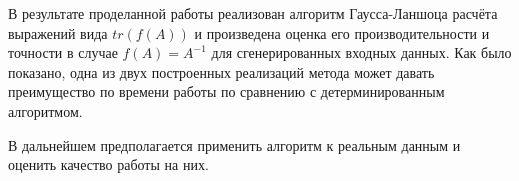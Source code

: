 В результате проделанной работы реализован алгоритм Гаусса-Ланшоца расчёта выражений вида $ tr(f(A)) $ и произведена оценка его производительности и точности в случае $ f(A) = A^{-1} $ для сгенерированных входных данных.
Как было показано, одна из двух построенных реализаций метода может давать преимущество по времени работы по сравнению с детерминированным алгоритмом.

В дальнейшем предполагается применить алгоритм к реальным данным и оценить качество работы на них.